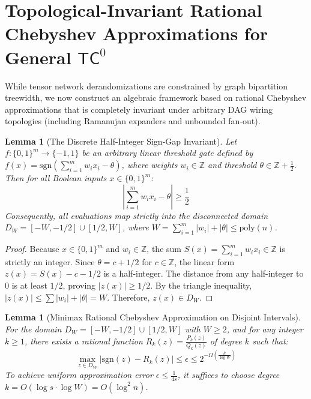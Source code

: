 \documentclass[11pt,a4paper]{article}
\newtheorem{lemma}[theorem]{Lemma}
\theoremstyle{definition}
\theoremstyle{remark}
\newcommand{\TC}{\mathsf{TC}}
\newcommand{\poly}{\mathrm{poly}}
\begin{document}
\section{Topological-Invariant Rational Chebyshev Approximations for General $\TC^0$}

While tensor network derandomizations are constrained by graph bipartition treewidth, we now construct an algebraic framework based on rational Chebyshev approximations that is completely invariant under arbitrary DAG wiring topologies (including Ramanujan expanders and unbounded fan-out).

\begin{lemma}[The Discrete Half-Integer Sign-Gap Invariant]\label{lem:sign_gap}
Let $f : \{0,1\}^m \to \{-1, 1\}$ be an arbitrary linear threshold gate defined by $f(x) = \mathrm{sgn}\left(\sum_{i=1}^m w_i x_i - \theta\right)$, where weights $w_i \in \mathbb{Z}$ and threshold $\theta \in \mathbb{Z} + \frac{1}{2}$. Then for all Boolean inputs $x \in \{0,1\}^m$:
\[
\left| \sum_{i=1}^m w_i x_i - \theta \right| \ge \frac{1}{2}
\]
Consequently, all evaluations map strictly into the disconnected domain $D_W = [-W, -1/2] \cup [1/2, W]$, where $W = \sum_{i=1}^m |w_i| + |\theta| \le \poly(n)$.
\end{lemma}

\begin{proof}
Because $x \in \{0,1\}^m$ and $w_i \in \mathbb{Z}$, the sum $S(x) = \sum_{i=1}^m w_i x_i \in \mathbb{Z}$ is strictly an integer. Since $\theta = c + 1/2$ for $c \in \mathbb{Z}$, the linear form $z(x) = S(x) - c - 1/2$ is a half-integer. The distance from any half-integer to 0 is at least $1/2$, proving $|z(x)| \ge 1/2$. By the triangle inequality, $|z(x)| \le \sum |w_i| + |\theta| = W$. Therefore, $z(x) \in D_W$.
\end{proof}

\begin{lemma}[Minimax Rational Chebyshev Approximation on Disjoint Intervals]\label{lem:chebyshev_approx}
For the domain $D_W = [-W, -1/2] \cup [1/2, W]$ with $W \ge 2$, and for any integer $k \ge 1$, there exists a rational function $R_k(z) = \frac{P_k(z)}{Q_k(z)}$ of degree $k$ such that:
\[
\max_{z \in D_W} |\mathrm{sgn}(z) - R_k(z)| \le \epsilon \le 2^{-\Omega\left(\frac{k}{\log W}\right)}
\]
To achieve uniform approximation error $\epsilon \le \frac{1}{4s}$, it suffices to choose degree $k = O(\log s \cdot \log W) = O(\log^2 n)$.
\end{lemma}
\end{document}
